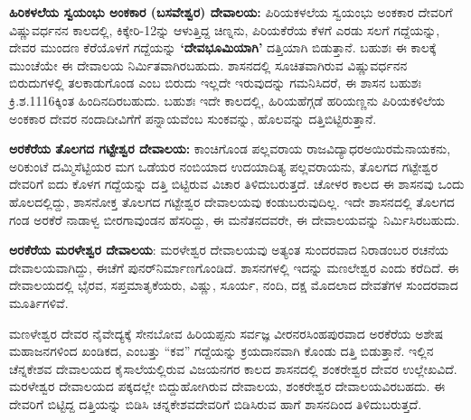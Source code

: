 \textbf{ಹಿರಿಕಳಲೆಯ ಸ್ವಯಂಭು ಅಂಕಕಾರ (ಬಸವೇಶ್ವರ) ದೇವಾಲಯ:} ಪಿರಿಯಕಳಲೆಯ ಸ್ವಯಂಭು ಅಂಕಕಾರ ದೇವರಿಗೆ ವಿಷ್ಣುವರ್ಧನನ ಕಾಲದಲ್ಲಿ, ಕಿಕ್ಕೇರಿ-12ನ್ನು ಆಳುತ್ತಿದ್ದ ಚಿಣ್ನನು, ಪಿರಿಯಕೆರೆಯ ಕೆಳಗೆ ಎರಡು ಸಲಗೆ ಗದ್ದೆಯನ್ನು, ದೇವರ ಮುಂದಣ ಕೆರೆಯೊಳಗೆ ಗದ್ದೆಯನ್ನು \textbf{‘ದೇವಭೂಮಿಯಾಗಿ’} ದತ್ತಿಯಾಗಿ ಬಿಡುತ್ತಾನೆ. ಬಹುಶಃ ಈ ಕಾಲಕ್ಕೆ ಮುಂಚೆಯೇ ಈ ದೇವಾಲಯ ನಿರ್ಮಿತವಾಗಿರಬಹುದು. ಶಾಸನದಲ್ಲಿ ಸೂಚಿತವಾಗಿರುವ ವಿಷ್ಣುವರ್ಧನನ ಬಿರುದುಗಳಲ್ಲಿ ತಲಕಾಡುಗೊಂಡ ಎಂಬ ಬಿರುದು ಇಲ್ಲದೇ ಇರುವುದನ್ನು ಗಮನಿಸಿದರೆ, ಈ ಶಾಸನ ಬಹುಶಃ ಕ್ರಿ.ಶ.1116ಕ್ಕಿಂತ ಹಿಂದಿನದಿರಬಹುದು. ಬಹುಶಃ ಇದೇ ಕಾಲದಲ್ಲಿ, ಹಿರಿಯಹೆಗ್ಗಡೆ ಹರಿಯಣ್ಣನು ಪಿರಿಯಕಳಿಲೆಯ ಅಂಕಕಾರ ದೇವರ ನಂದಾದೀವಿಗೆಗೆ ಪನ್ನಾಯವೆಂಬ ಸುಂಕವನ್ನು, ಹೊಲವನ್ನು ದತ್ತಿಬಿಟ್ಟಿರುತ್ತಾನೆ.

\textbf{ಅರಕೆರೆಯ ತೊಲಗದ ಗಟ್ಟೇಶ್ವರ ದೇವಾಲಯ:} ಕಾಂಚಿಗೊಂಡ ಪಲ್ಲವರಾಯ ರಾಜವಿದ್ಯಾಧರ\break ಅಯಿರಮೆನಾಯಕನು, ಅರಿಕುಂಟೆ ದಮ್ಮಿಸೆಟ್ಟಿಯರ ಮಗ ಒಡೆಯರ ನಂಬಿಯಾದ ಉದಯಾದಿತ್ಯ ಪಲ್ಲವರಾಯನು, ತೊಲಗದ ಗಟ್ಟೇಶ್ವರ ದೇವರಿಗೆ ಐದು ಕೊಳಗ ಗದ್ದೆಯನ್ನು ದತ್ತಿ ಬಿಟ್ಟಿರುವ ವಿಚಾರ ತಿಳಿದುಬರುತ್ತದೆ. ಚೋಳರ ಕಾಲದ ಈ ಶಾಸನವು ಒಂದು ಹೊಲದಲ್ಲಿದ್ದು, ಶಾಸನೋಕ್ತ ತೊಲಗದ ಗಟ್ಟೇಶ್ವರ ದೇವಾಲಯವು ಕಂಡುಬರುವುದಿಲ್ಲ. ಇದೇ ಶಾಸನದಲ್ಲಿ ತೊಲಗದ ಗಂಡ ಅರಕೆರೆ ನಾಡಾಳ್ವ ಬೀರಗಾವುಂಡನ ಹೆಸರಿದ್ದು, ಈ ಮನೆತನದವರೇ, ಈ ದೇವಾಲಯವನ್ನು ನಿರ್ಮಿಸಿರಬಹುದು.

\textbf{ಅರಕೆರೆಯ ಮರಳೇಶ್ವರ ದೇವಾಲಯ}: ಮರಳೇಶ್ವರ ದೇವಾಲಯವು ಅತ್ಯಂತ ಸುಂದರವಾದ ನಿರಾಡಂಬರ ರಚನೆಯ ದೇವಾಲಯವಾಗಿದ್ದು, ಈಚೆಗೆ ಪುನರ್​ನಿರ್ಮಾಣಗೊಂಡಿದೆ. ಶಾಸನಗಳಲ್ಲಿ ಇದನ್ನು ಮಣಲೇಶ್ವರ ಎಂದು ಕರೆದಿದೆ. ಈ ದೇವಾಲಯದಲ್ಲಿ ಭೈರವ, ಸಪ್ತಮಾತೃಕೆಯರು, ವಿಷ್ಣು, ಸೂರ್ಯ, ನಂದಿ, ದಕ್ಷ ಮೊದಲಾದ ದೇವತೆಗಳ ಸುಂದರವಾದ ಮೂರ್ತಿಗಳಿವೆ.

ಮಣಳೇಶ್ವರ ದೇವರ ನೈವೇದ್ಯಕ್ಕೆ ಸೇನಬೋವ ಹಿರಿಯಪ್ಪನು ಸರ್ವಜ್ಞ ವೀರನರಸಿಂಹಪುರವಾದ ಅರಕೆರೆಯ ಅಶೇಷ ಮಹಾಜನಗಳಿಂದ ಖಂಡಿಕದ, ಎಂಬತ್ತು “ಕವ” ಗದ್ದೆಯನ್ನು ಕ್ರಯದಾನವಾಗಿ ಕೊಂಡು ದತ್ತಿ ಬಿಡುತ್ತಾನೆ. ಇಲ್ಲಿನ ಚೆನ್ನಕೇಶವ ದೇವಾಲಯದ ಕೈಸಾಲೆಯಲ್ಲಿರುವ ವಿಜಯನಗರ ಕಾಲದ ಶಾಸನದಲ್ಲಿ ಶಂಕರೇಶ್ವರ ದೇವರ ಉಲ್ಲೇಖವಿದೆ. ಮರಳೇಶ್ವರ ದೇವಾಲಯದ ಪಕ್ಕದಲ್ಲೇ ಬಿದ್ದುಹೋಗಿರುವ ದೇವಾಲಯ, ಶಂಕರೇಶ್ವರ ದೇವಾಲಯವಿರಬಹದು. ಈ ದೇವರಿಗೆ ಬಿಟ್ಟಿದ್ದ ದತ್ತಿಯನ್ನು ಬಿಡಿಸಿ ಚನ್ನಕೇಶವದೇವರಿಗೆ ಬಿಡಿಸಿರುವ ಹಾಗೆ ಶಾಸನದಿಂದ ತಿಳಿದುಬರುತ್ತದೆ.

